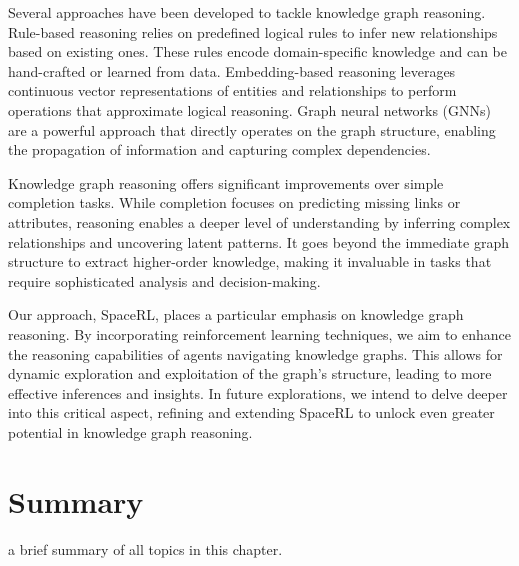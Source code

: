 Several approaches have been developed to tackle knowledge graph reasoning. Rule-based reasoning relies on predefined logical rules to infer new relationships based on existing ones. These rules encode domain-specific knowledge and can be hand-crafted or learned from data. Embedding-based reasoning leverages continuous vector representations of entities and relationships to perform operations that approximate logical reasoning. Graph neural networks (GNNs) are a powerful approach that directly operates on the graph structure, enabling the propagation of information and capturing complex dependencies.


Knowledge graph reasoning offers significant improvements over simple completion tasks. While completion focuses on predicting missing links or attributes, reasoning enables a deeper level of understanding by inferring complex relationships and uncovering latent patterns. It goes beyond the immediate graph structure to extract higher-order knowledge, making it invaluable in tasks that require sophisticated analysis and decision-making.

Our approach, SpaceRL, places a particular emphasis on knowledge graph reasoning. By incorporating reinforcement learning techniques, we aim to enhance the reasoning capabilities of agents navigating knowledge graphs. This allows for dynamic exploration and exploitation of the graph's structure, leading to more effective inferences and insights. In future explorations, we intend to delve deeper into this critical aspect, refining and extending SpaceRL to unlock even greater potential in knowledge graph reasoning.

\section{Summary}\label{sec:kgs-summary}


a brief summary of all topics in this chapter.

